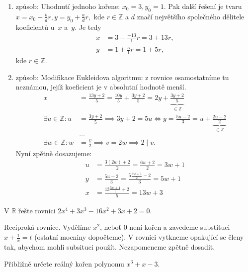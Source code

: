 \begin{reseni}
\begin{enumerate}[1.]
\item způsob: Uhodnutí jednoho kořene: $x_0=3, y_0=1.$ Pak další řešení je tvaru
$x=x_0-\frac{b}{d}r, y=y_0+\frac{a}{d}r,$ kde $r \in \mathbb Z$ a $d$ značí
největšího společného dělitele koeficientů u~$x$ a~$y$. Je tedy
\begin{align*}
    x&=3-\frac{-13}{1}r=3+13r, \\
    y &= 1+\frac{5}{1}r = 1+5r,
\end{align*}
kde $r\in \mathbb Z.$
\item způsob: Modifikace Eukleidova algoritmu: z rovnice osamostatníme tu neznámou,
jejíž koeficient je v absolutní hodnotě menší.
\begin{align*}
    x &= \frac{13y+2}{5}=\frac{10y}{5}+\frac{3y+2}{5}=2y+\underbrace{\frac{3y+2}{5}}_{\in \mathbb Z}\\
    \exists u \in \mathbb Z\colon u &= \frac{3y+2}{5}\implies 3y+2=5u \iff y=\frac{5u-2}{3}=u+\underbrace{\frac{2u-2}{2}}_{\in \mathbb Z} \\
     & \dots \\
     \exists w \in \mathbb Z\colon w &= \frac{v}{2}\implies v = 2w \implies 2 \mid v.
\end{align*}
Nyní zpětně dosazujeme:
\begin{align*}
    u&= \frac{3(2w)+2}{2}=\frac{6w+2}{2}=3w+1\\
    y&=\frac{5u-2}{3}=\frac{5 \frac{3w+1}{2}-2}{3}=5w+1 \\
    x &= \frac{13 \frac{5w+1}{1}+2}{5}=13w+3
\end{align*}
\end{enumerate}
\end{reseni}

\begin{priklad}
V $\mathbb R$ řešte rovnici $2x^4+3x^3-16x^2+3x+2=0.$
\end{priklad}

\begin{reseni}
Reciproká rovnice. Vydělíme $x^2$, neboť 0 není kořen a zavedeme substituci
$x+\frac{1}{x}=t$ (ostatní mocniny dopočteme). V rovnici vytkneme opakující se členy
tak, abychom mohli  subsituci použít. Nezapomeneme zpětně dosadit.
\end{reseni}

\begin{priklad}
Přibližně určete reálný kořen polynomu $x^3+x-3$.
\end{priklad}

